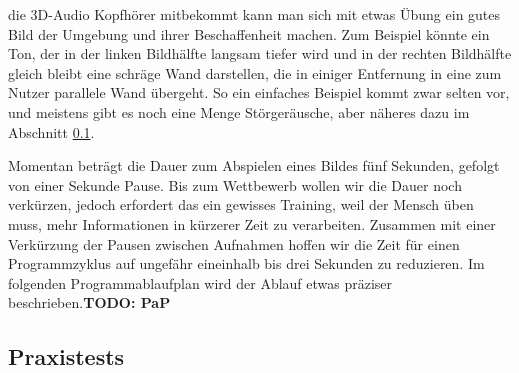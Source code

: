 \documentclass[a4paper,12pt,ngerman]{scrartcl}
\begin{document}
die 3D-Audio Kopfhörer mitbekommt kann man sich mit etwas Übung ein gutes Bild der Umgebung und ihrer
Beschaffenheit machen. Zum Beispiel könnte ein Ton, der in der linken Bildhälfte langsam tiefer wird und 
in der rechten Bildhälfte gleich bleibt eine schräge Wand darstellen, die in einiger Entfernung in eine
zum Nutzer parallele Wand übergeht. So ein einfaches Beispiel kommt zwar selten vor, und meistens gibt es
noch eine Menge Störgeräusche, aber näheres dazu im Abschnitt \ref{testsAndResults}.\par 
Momentan beträgt die Dauer zum Abspielen eines Bildes fünf Sekunden, gefolgt von einer Sekunde 
Pause. Bis zum Wettbewerb wollen wir die Dauer noch verkürzen, jedoch erfordert das ein gewisses 
Training, weil der Mensch üben muss, mehr Informationen in kürzerer Zeit zu verarbeiten. Zusammen mit 
einer Verkürzung der Pausen zwischen Aufnahmen hoffen wir die Zeit für einen Programmzyklus auf ungefähr
eineinhalb bis drei Sekunden zu reduzieren. Im folgenden Programmablaufplan wird der Ablauf etwas 
präziser beschrieben.\textbf{TODO: PaP} \newline

\subsection{Praxistests} \label{testsAndResults}
\end{document}
